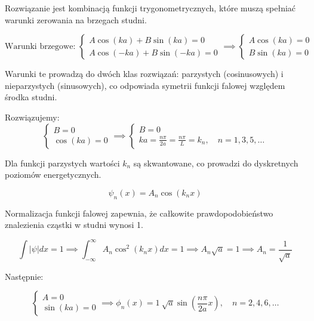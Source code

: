 Rozwiązanie jest kombinacją funkcji trygonometrycznych, które muszą spełniać warunki zerowania na brzegach studni.


\begin{equation*}
    \text{Warunki brzegowe: }
    \begin{cases}
        A \cos(ka) + B \sin(ka) = 0 \\
        A \cos(-ka) + B \sin(-ka) = 0
    \end{cases}
    \implies
    \begin{cases}
        A \cos(ka) = 0 \\
        B \sin(ka) = 0
    \end{cases}
\end{equation*}

Warunki te prowadzą do dwóch klas rozwiązań: parzystych (cosinusowych) i nieparzystych (sinusowych),
co odpowiada symetrii funkcji falowej względem środka studni.

Rozwiązujemy:
\begin{equation*}
    \begin{cases}
        B = 0 \\
        \cos(ka) = 0
    \end{cases}
    \implies
    \begin{cases}
        B = 0 \\
        ka = \frac{n \pi}{2 a} = \frac{n \pi}{L} = k_n, \quad n = 1, 3, 5, \ldots
    \end{cases}
\end{equation*}

Dla funkcji parzystych wartości $k_n$ są skwantowane, co prowadzi do dyskretnych poziomów energetycznych.


\begin{equation*}
    \psi_n(x) = A_n \cos(k_n x)
\end{equation*}

Normalizacja funkcji falowej zapewnia, że całkowite prawdopodobieństwo znalezienia cząstki w studni wynosi 1.

\begin{equation*}
    \int |\psi| dx = 1 \implies \int_{-\infty}^{\infty} A_n \cos^2 (k_n x) dx = 1 \implies A_n \sqrt{a} = 1 \implies A_n = \frac{1}{\sqrt{a}}
\end{equation*}


Następnie:

\begin{equation*}
    \begin{cases}
        A = 0 \\
        \sin(ka) = 0
    \end{cases}
    \implies
    \phi_n(x) = 1 \ \sqrt{a} \sin(\frac{n \pi}{2a} x), \quad n = 2, 4, 6, \ldots
\end{equation*}

